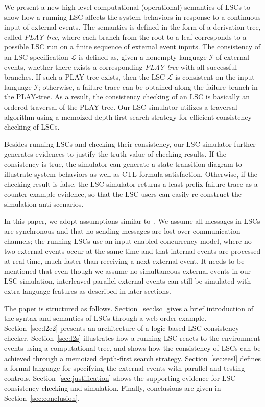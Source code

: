 \documentclass[]{llncs}
\begin{document}
We present a new high-level computational (operational)
semantics of LSCs to show how a running LSC affects the system
behaviors in response to a continuous input of external events.
The semantics is defined in the form of a derivation tree,
called {\em PLAY-tree}, where each branch from the root to
a leaf corresponds to a possible LSC run on a finite sequence of
external event inputs. The consistency of an LSC specification
$\mathcal{L}$ is defined as, given a nonempty language
$\mathcal{I}$ of external events, whether there exists a
corresponding {\em PLAY-tree} with all successful branches.
If such a PLAY-tree exists, then the LSC $\mathcal{L}$
is consistent on the input language $\mathcal{I}$;
otherwise, a failure trace can be obtained along
the failure branch in the PLAY-tree.
As a result, the consistency checking of an LSC is basically
an ordered traversal of the PLAY-tree.
Our LSC simulator utilizes a traversal algorithm using
a memoized depth-first search strategy for
efficient consistency checking of LSCs.

Besides running LSCs and checking their consistency, our
LSC simulator further generates evidences to justify the
truth value of checking results. If the consistency is
true, the simulator can generate a state transition
diagram to illustrate system behaviors as well as
CTL formula satisfaction. Otherwise, if the checking
result is false, the LSC simulator returns a least prefix
failure trace as a counter-example evidence, so that the
LSC users can easily re-construct the simulation anti-scenarios.

In this paper, we adopt assumptions similar to~\cite{HM03}.
We assume all messages in LSCs are synchronous
and that no sending messages are lost over communication channels;
the running LSCs use an input-enabled concurrency model, where
no two external events occur at the same time and
that internal events are processed at real-time,
much faster than receiving a next external event.
It needs to be mentioned that even though we
assume no simultaneous external events in our LSC simulation,
interleaved parallel external events can still be simulated
with extra language features as described in later sections.

The paper is structured as follows. Section~\ref{sec:lsc}
gives a brief introduction of the syntax and semantics of
LSCs through a web order example.
Section~\ref{sec:l2c2} presents an architecture of
a logic-based LSC consistency checker.
Section~\ref{sec:l2s} illustrates how a running LSC reacts to the
environment events using a computational tree, and shows
how the consistency of LSCs can be achieved through a memoized depth-first
search strategy.
Section~\ref{sec:eesl} defines a formal language
for specifying the external events with parallel and testing controls.
Section~\ref{sec:justification} shows the supporting evidence for
LSC consistency checking and simulation.
Finally, conclusions are given in Section~\ref{sec:conclusion}.
\end{document}
